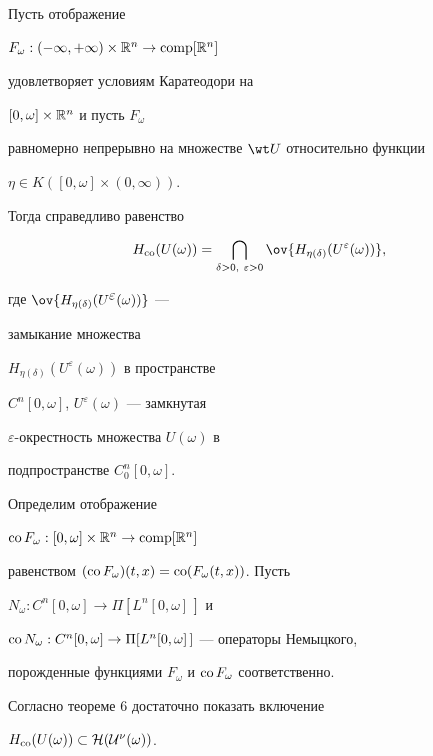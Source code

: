 \begin{cor} Пусть отображение


$F_\omega:(-\infty,+\infty)\times\Bbb R^n\to\operatorname{comp}[\Bbb R^n]$


удовлетворяет условиям Каратеодори на


$[0,\omega]\times\Bbb R^n$ и пусть $F_\omega$


равномерно непрерывно на множестве $\wt U$ относительно функции


$\eta\in K([0,\omega]\times(0,\infty))$.


Тогда справедливо равенство


\begin{equation}


H_{\co}(U(\omega))=


\bigcap_{\delta>0,\ \varepsilon>0}


\ov{H_{\eta(\delta)}(U^\varepsilon(\omega))},


\end{equation}


где $\ov{H_{\eta(\delta)}(U^{\displaystyle\varepsilon}(\omega))}$ ---


замыкание множества


$H_{\eta(\delta)}(U^\varepsilon(\omega))$ в пространстве


$C^n[0,\omega]$, $U^\varepsilon(\omega)$ --- замкнутая


$\varepsilon$-окрестность множества $U(\omega)$ в


подпространстве $C^n_0[0,\omega]$.


\end{cor}





Определим отображение


$\operatorname{co} F_\omega:[0,\omega]\times\Bbb R^n\to\operatorname{comp}[\Bbb R^n]$


равенством $(\operatorname{co} F_\omega)(t,x)=\operatorname{co}(F_\omega(t,x))$. Пусть


$N_\omega:C^n[0,\omega]\to\Pi[L^n[0,\omega]\,]$ и


$\operatorname{co} N_\omega:C^n[0,\omega]\to\Pi[L^n[0,\omega]\,]$ --- операторы Немыцкого,


порожденные функциями $F_\omega$ и $\operatorname{co} F_\omega$ соответственно.





Согласно теореме 6 достаточно показать включение


$H_{\operatorname{co}}(U(\omega))\subset\cal H(U^\nu(\omega))$.


